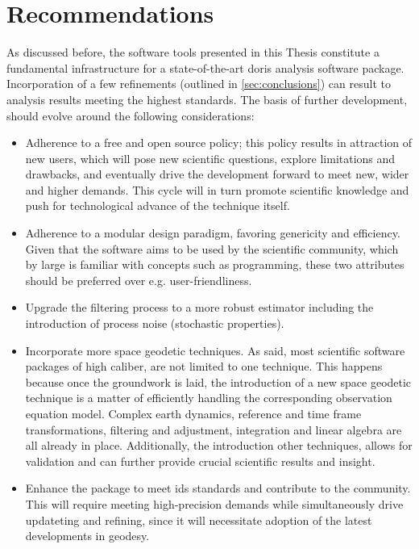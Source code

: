\section{Recommendations}\label{sec:recommendations}

As discussed before, the software tools presented in this Thesis constitute a 
fundamental infrastructure for a state-of-the-art \gls{doris} analysis software 
package. Incorporation of a few refinements (outlined in \autoref{sec:conclusions}) 
can result to analysis results meeting the highest standards. The basis of further 
development, should evolve around the following considerations:
\begin{itemize}
  \item Adherence to a free and open source policy; this policy results in attraction 
    of new users, which will pose new scientific questions, explore limitations and 
    drawbacks, and eventually drive the development forward to meet new, wider and 
    higher demands. This cycle will in turn promote scientific knowledge and push 
    for technological advance of the technique itself.

  \item Adherence to a modular design paradigm, favoring genericity and efficiency. 
    Given that the software aims to be used by the scientific community, which by large is 
    familiar with concepts such as programming, these two attributes should be preferred 
    over e.g. user-friendliness.

  \item Upgrade the filtering process to a more robust estimator including the 
    introduction of process noise (stochastic properties).

  \item Incorporate more space geodetic techniques. As said, most scientific 
    software packages of high caliber, are not limited to one technique. This happens 
    because once the groundwork is laid, the introduction of a new space geodetic 
    technique is a matter of efficiently handling the corresponding observation 
    equation model. Complex earth dynamics, reference and time frame transformations, 
    filtering and adjustment, integration and linear algebra are all already in place. 
    Additionally, the introduction other techniques, allows for validation and 
    can further provide crucial scientific results and insight.

  \item Enhance the package to meet \gls{ids} standards and contribute to the 
    community. This will require meeting high-precision demands while simultaneously drive
    updateting and refining, since it will necessitate adoption of 
    the latest developments in geodesy.
\end{itemize}
